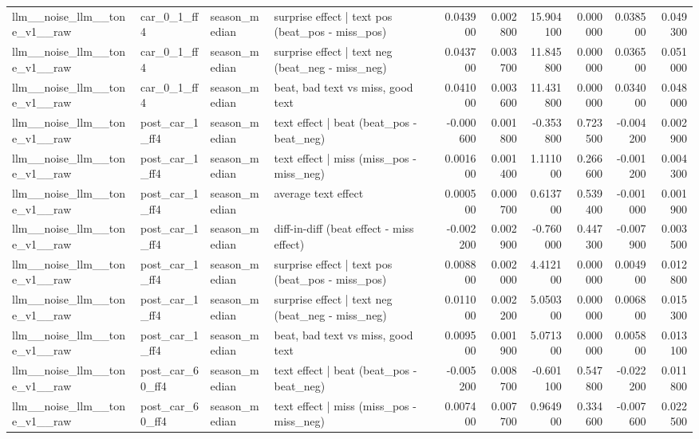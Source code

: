 \begin{table}
\begin{tabular}{llllrrrrrr}
llm\_\_noise\_llm\_\_tone\_v1\_\_raw & car\_0\_1\_ff4 & season\_median & surprise effect | text pos (beat\_pos - miss\_pos) & 0.043900 & 0.002800 & 15.904100 & 0.000000 & 0.038500 & 0.049300 \\
llm\_\_noise\_llm\_\_tone\_v1\_\_raw & car\_0\_1\_ff4 & season\_median & surprise effect | text neg (beat\_neg - miss\_neg) & 0.043700 & 0.003700 & 11.845800 & 0.000000 & 0.036500 & 0.051000 \\
llm\_\_noise\_llm\_\_tone\_v1\_\_raw & car\_0\_1\_ff4 & season\_median & beat, bad text vs miss, good text & 0.041000 & 0.003600 & 11.431800 & 0.000000 & 0.034000 & 0.048000 \\
llm\_\_noise\_llm\_\_tone\_v1\_\_raw & post\_car\_1\_ff4 & season\_median & text effect | beat  (beat\_pos - beat\_neg) & -0.000600 & 0.001800 & -0.353800 & 0.723500 & -0.004200 & 0.002900 \\
llm\_\_noise\_llm\_\_tone\_v1\_\_raw & post\_car\_1\_ff4 & season\_median & text effect | miss  (miss\_pos - miss\_neg) & 0.001600 & 0.001400 & 1.111000 & 0.266600 & -0.001200 & 0.004300 \\
llm\_\_noise\_llm\_\_tone\_v1\_\_raw & post\_car\_1\_ff4 & season\_median & average text effect & 0.000500 & 0.000700 & 0.613700 & 0.539400 & -0.001000 & 0.001900 \\
llm\_\_noise\_llm\_\_tone\_v1\_\_raw & post\_car\_1\_ff4 & season\_median & diff-in-diff (beat effect - miss effect) & -0.002200 & 0.002900 & -0.760000 & 0.447300 & -0.007900 & 0.003500 \\
llm\_\_noise\_llm\_\_tone\_v1\_\_raw & post\_car\_1\_ff4 & season\_median & surprise effect | text pos (beat\_pos - miss\_pos) & 0.008800 & 0.002000 & 4.412100 & 0.000000 & 0.004900 & 0.012800 \\
llm\_\_noise\_llm\_\_tone\_v1\_\_raw & post\_car\_1\_ff4 & season\_median & surprise effect | text neg (beat\_neg - miss\_neg) & 0.011000 & 0.002200 & 5.050300 & 0.000000 & 0.006800 & 0.015300 \\
llm\_\_noise\_llm\_\_tone\_v1\_\_raw & post\_car\_1\_ff4 & season\_median & beat, bad text vs miss, good text & 0.009500 & 0.001900 & 5.071300 & 0.000000 & 0.005800 & 0.013100 \\
llm\_\_noise\_llm\_\_tone\_v1\_\_raw & post\_car\_60\_ff4 & season\_median & text effect | beat  (beat\_pos - beat\_neg) & -0.005200 & 0.008700 & -0.601100 & 0.547800 & -0.022200 & 0.011800 \\
llm\_\_noise\_llm\_\_tone\_v1\_\_raw & post\_car\_60\_ff4 & season\_median & text effect | miss  (miss\_pos - miss\_neg) & 0.007400 & 0.007700 & 0.964900 & 0.334600 & -0.007600 & 0.022500 \\

\end{tabular}
\end{table}
